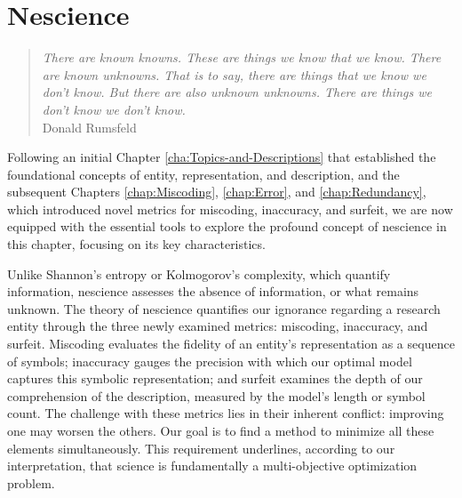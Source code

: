 %
%


%
%


\chapter{Nescience}
\label{chap:Nescience}

\begin{quote}
\begin{flushright}
\emph{There are known knowns. These are things we know that we know.
There are known unknowns. That is to say, there are things that we know we don't know.
But there are also unknown unknowns. There are things we don't know we don't know.} \\
Donald Rumsfeld
\end{flushright}
\end{quote}
\bigskip

Following an initial Chapter \ref{cha:Topics-and-Descriptions} that established the foundational concepts of entity, representation, and description, and the subsequent Chapters \ref{chap:Miscoding}, \ref{chap:Error}, and \ref{chap:Redundancy}, which introduced novel metrics for miscoding, inaccuracy, and surfeit, we are now equipped with the essential tools to explore the profound concept of nescience in this chapter, focusing on its key characteristics.

Unlike Shannon's entropy or Kolmogorov's complexity, which quantify information, nescience assesses the absence of information, or what remains unknown. The theory of nescience quantifies our ignorance regarding a research entity through the three newly examined metrics: miscoding, inaccuracy, and surfeit. Miscoding evaluates the fidelity of an entity's representation as a sequence of symbols; inaccuracy gauges the precision with which our optimal model captures this symbolic representation; and surfeit examines the depth of our comprehension of the description, measured by the model's length or symbol count. The challenge with these metrics lies in their inherent conflict: improving one may worsen the others. Our goal is to find a method to minimize all these elements simultaneously. This requirement underlines, according to our interpretation, that science is fundamentally a multi-objective optimization problem.

